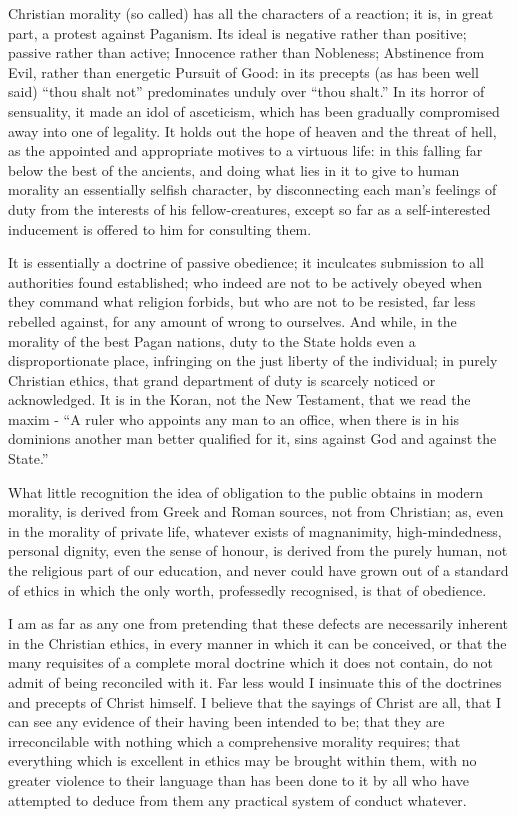 Christian morality (so called) has all the characters of a reaction; it is, in great part, a protest against Paganism. Its ideal is negative rather than positive; passive rather than active; Innocence rather than Nobleness; Abstinence from Evil, rather than energetic Pursuit of Good: in its precepts (as has been well said) “thou shalt not” predominates unduly over “thou shalt.” In its horror of sensuality, it made an idol of asceticism, which has been gradually compromised away into one of legality. It holds out the hope of heaven and the threat of hell, as the appointed and appropriate motives to a virtuous life: in this falling far below the best of the ancients, and doing what lies in it to give to human morality an essentially selfish character, by disconnecting each man’s feelings of duty from the interests of his fellow-creatures, except so far as a self-interested inducement is offered to him for consulting them.\par

It is essentially a doctrine of passive obedience; it inculcates submission to all authorities found established; who indeed are not to be actively obeyed when they command what religion forbids, but who are not to be resisted, far less rebelled against, for any amount of wrong to ourselves. And while, in the morality of the best Pagan nations, duty to the State holds even a disproportionate place, infringing on the just liberty of the individual; in purely Christian ethics, that grand department of duty is scarcely noticed or acknowledged. It is in the Koran, not the New Testament, that we read the maxim - “A ruler who appoints any man to an office, when there is in his dominions another man better qualified for it, sins against God and against the State.”\par

What little recognition the idea of obligation to the public obtains in modern morality, is derived from Greek and Roman sources, not from Christian; as, even in the morality of private life, whatever exists of magnanimity, high-mindedness, personal dignity, even the sense of honour, is derived from the purely human, not the religious part of our education, and never could have grown out of a standard of ethics in which the only worth, professedly recognised, is that of obedience.\par

I am as far as any one from pretending that these defects are necessarily inherent in the Christian ethics, in every manner in which it can be conceived, or that the many requisites of a complete moral doctrine which it does not contain, do not admit of being reconciled with it. Far less would I insinuate this of the doctrines and precepts of Christ himself. I believe that the sayings of Christ are all, that I can see any evidence of their having been intended to be; that they are irreconcilable with nothing which a comprehensive morality requires; that everything which is excellent in ethics may be brought within them, with no greater violence to their language than has been done to it by all who have attempted to deduce from them any practical system of conduct whatever.\par

